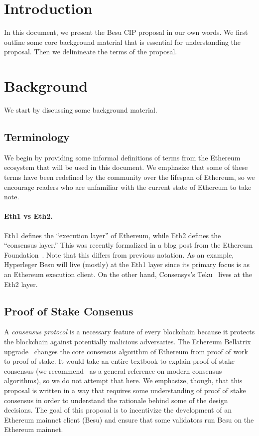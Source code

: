 
\section{Introduction} \label{sec:introduction}

In this document, we present the Besu CIP proposal in our own words.  We first outline some core background material that is essential for understanding the proposal.  Then we delinineate the terms of the proposal.

\section{Background}
We start by discussing some background material.

\subsection{Terminology}
We begin by providing some informal definitions of terms from the Ethereum ecosystem that will be used in this document.  We emphasize that some of these terms have been redefined by the community over the lifespan of Ethereum, so we encourage readers who are unfamiliar with the current state of Ethereum to take note.

\paragraph{Eth1 vs Eth2.}  Eth1 defines the ``execution layer'' of Ethereum, while Eth2 defines the ``consensus layer.''  This was recently formalized in a blog post from the Ethereum Foundation~\cite{Eth1-2}.  Note that this differs from previous notation.  As an example, Hyperleger Besu will live (mostly) at the Eth1 layer since its primary focus is as an Ethereum execution client.  On the other hand, Consensys's Teku~\cite{Teku} lives at the Eth2 layer.

\subsection{Proof of Stake Consenus}
A \emph{consensus protocol} is a necessary feature of every blockchain because it protects the blockchain against potentially malicious adversaries.  The Ethereum Bellatrix upgrade~\cite{EthBella} changes the core consensus algorithm of Ethereum from proof of work to proof of stake.  It would take an entire textbook to explain proof of stake consensus (we recommend~\cite{ShiBook} as a general reference on modern consensus algorithms), so we do not attempt that here.  We emphasize, though, that this proposal is written in a way that requires some understanding of proof of stake consensus in order to understand the rationale behind some of the design decisions.  The goal of this proposal is to incentivize the development of an Ethereum mainnet client (Besu) and ensure that some validators run Besu on the Ethereum mainnet.

